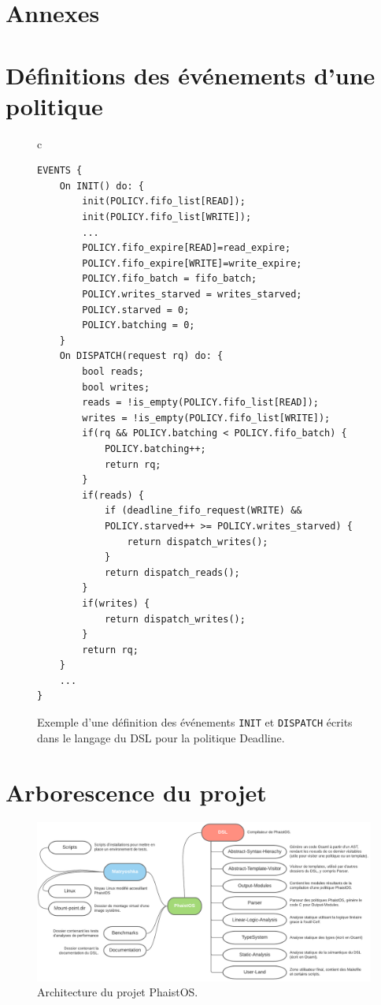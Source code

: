 \section{Annexes}
\label{appendix}
\appendix

\newpage
\section*{Définitions des événements d'une politique}
\begin{figure}[h!t]
    \centering
    \begin{tabular}{c}
        \begin{lstlisting}[language=Phaistos, linewidth=13cm]
EVENTS {
    On INIT() do: {
        init(POLICY.fifo_list[READ]); 
        init(POLICY.fifo_list[WRITE]);
        ...
        POLICY.fifo_expire[READ]=read_expire;
        POLICY.fifo_expire[WRITE]=write_expire; 
        POLICY.fifo_batch = fifo_batch;
        POLICY.writes_starved = writes_starved;
        POLICY.starved = 0;
        POLICY.batching = 0;
    }
    On DISPATCH(request rq) do: {
        bool reads; 
        bool writes;
        reads = !is_empty(POLICY.fifo_list[READ]);
        writes = !is_empty(POLICY.fifo_list[WRITE]);
        if(rq && POLICY.batching < POLICY.fifo_batch) {
            POLICY.batching++;
            return rq;
        }
        if(reads) {
            if (deadline_fifo_request(WRITE) &&
            POLICY.starved++ >= POLICY.writes_starved) {
                return dispatch_writes();
            }
            return dispatch_reads();
        }
        if(writes) {
            return dispatch_writes();
        }
        return rq; 
    }
    ...
}
        \end{lstlisting}
    \end{tabular}
    \caption{Exemple d'une définition des événements \texttt{INIT} et \texttt{DISPATCH} écrits dans le langage du DSL pour la politique Deadline.}
    \label{fig:event-code}
\end{figure}

\newpage
\section*{Arborescence du projet}
\begin{figure}[h!t] \centering
    \includegraphics[width=\textwidth]{images/arch}
    \caption{Architecture du projet PhaistOS.}
    \label{fig:arch}
\end{figure}

